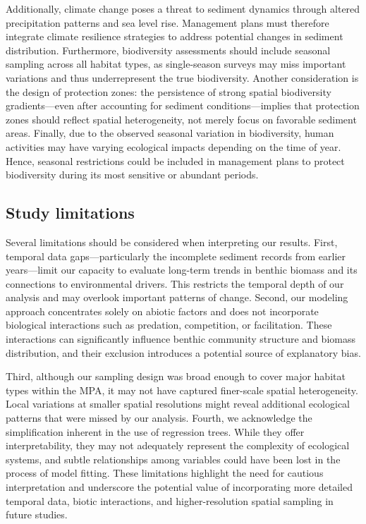 \documentclass[12pt]{article}
\begin{document}
\qquad Additionally, climate change poses a threat to sediment dynamics through
altered precipitation patterns and sea level rise. Management plans must
therefore integrate climate resilience strategies to address potential changes
in sediment distribution. Furthermore, biodiversity assessments should include
seasonal sampling across all habitat types, as single-season surveys may miss
important variations and thus underrepresent the true biodiversity. Another
consideration is the design of protection zones: the persistence of strong
spatial biodiversity gradients—even after accounting for sediment
conditions—implies that protection zones should reflect spatial heterogeneity,
not merely focus on favorable sediment areas. Finally, due to the observed
seasonal variation in biodiversity, human activities may have varying ecological
impacts depending on the time of year. Hence, seasonal restrictions could be
included in management plans to protect biodiversity during its most sensitive
or abundant periods.

\subsection{Study limitations}

\qquad Several limitations should be considered when interpreting our results.
First, temporal data gaps—particularly the incomplete sediment records from
earlier years—limit our capacity to evaluate long-term trends in benthic biomass
and its connections to environmental drivers. This restricts the temporal depth
of our analysis and may overlook important patterns of change. Second, our
modeling approach concentrates solely on abiotic factors and does not
incorporate biological interactions such as predation, competition, or
facilitation. These interactions can significantly influence benthic community
structure and biomass distribution, and their exclusion introduces a potential
source of explanatory bias.

\qquad Third, although our sampling design was broad enough to cover major
habitat types within the MPA, it may not have captured finer-scale spatial
heterogeneity. Local variations at smaller spatial resolutions might reveal
additional ecological patterns that were missed by our analysis. Fourth, we
acknowledge the simplification inherent in the use of regression trees. While
they offer interpretability, they may not adequately represent the complexity of
ecological systems, and subtle relationships among variables could have been
lost in the process of model fitting. These limitations highlight the need for
cautious interpretation and underscore the potential value of incorporating more
detailed temporal data, biotic interactions, and higher-resolution spatial
sampling in future studies.
\end{document}
